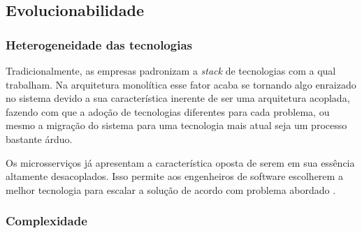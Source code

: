 \subsection{Evolucionabilidade}

\subsubsection{Heterogeneidade das tecnologias}

Tradicionalmente, as empresas padronizam a \textit{stack} de tecnologias com a qual trabalham. Na
arquitetura monolítica esse fator acaba se tornando algo enraizado no sistema devido a sua
característica inerente de ser uma arquitetura acoplada, fazendo com que a adoção de tecnologias
diferentes para cada problema, ou mesmo a migração do sistema para uma tecnologia mais atual seja um
processo bastante árduo.

Os microsserviços já apresentam a característica oposta de serem em sua essência altamente
desacoplados. Isso permite aos engenheiros de software escolherem a melhor tecnologia para escalar a
solução de acordo com problema abordado \cite{Richards2020:FundamentalsOfSoftwareArchitecture}.

\subsubsection{Complexidade}


